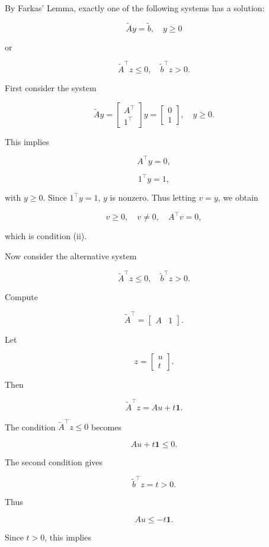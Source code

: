 \documentclass[
	12pt,
]{fphw}
\begin{document}
By Farkas' Lemma, exactly one of the following systems has a solution:

\[
\tilde{A}y = \tilde{b}, \quad y \ge 0
\]

or

\[
\tilde{A}^\top z \le 0, \quad \tilde{b}^\top z > 0.
\]

\bigskip

First consider the system

\[
\tilde{A}y =
\begin{bmatrix}
A^\top \\
1^\top
\end{bmatrix}
y
=
\begin{bmatrix}
0 \\
1
\end{bmatrix},
\quad y \ge 0.
\]

This implies

\[
A^\top y = 0,
\]

\[
1^\top y = 1,
\]

with $y \ge 0$. Since $1^\top y = 1$, $y$ is nonzero.  
Thus letting $v=y$, we obtain

\[
v \ge 0, \quad v \ne 0, \quad A^\top v = 0,
\]

which is condition (ii).

\bigskip

Now consider the alternative system

\[
\tilde{A}^\top z \le 0, \quad \tilde{b}^\top z > 0.
\]

Compute

\[
\tilde{A}^\top =
\begin{bmatrix}
A & 1
\end{bmatrix}.
\]

Let

\[
z =
\begin{bmatrix}
u \\
t
\end{bmatrix}.
\]

Then

\[
\tilde{A}^\top z = Au + t\mathbf{1}.
\]

The condition $\tilde{A}^\top z \le 0$ becomes

\[
Au + t\mathbf{1} \le 0.
\]

The second condition gives

\[
\tilde{b}^\top z = t > 0.
\]

Thus

\[
Au \le -t\mathbf{1}.
\]

Since $t>0$, this implies
\end{document}
